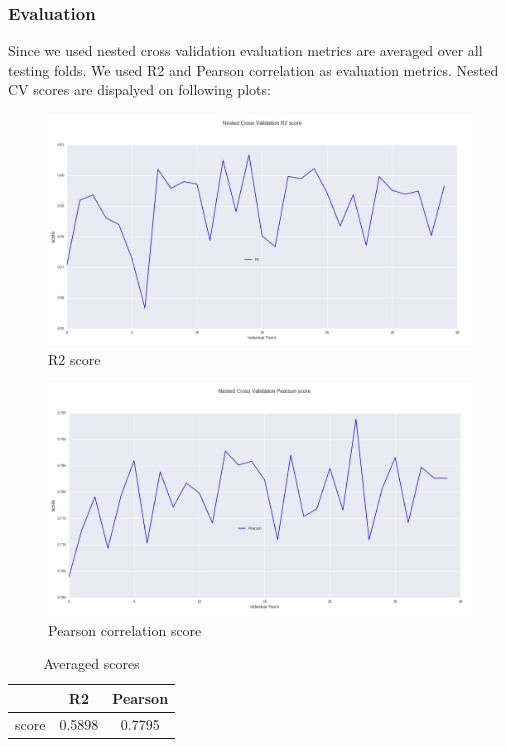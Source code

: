 \documentclass[10pt, a4paper]{article}
\begin{document}
\subsubsection{Evaluation}
Since we used nested cross validation evaluation metrics are averaged over all testing folds. We used R2 and Pearson correlation as evaluation metrics. Nested CV scores are dispalyed on following plots:


\begin{figure}
\begin{center}
	\centering
	\includegraphics[scale=0.36]{R2.png}
	\caption{R2 score}
\end{center}
\end{figure}


\begin{figure}
\begin{center}
	\centering
	\includegraphics[scale=0.36]{Pearson.png}
	\caption{Pearson correlation score}
\end{center}
\end{figure}

\begin{table}
\caption{Averaged scores}
\label{tab:narrow-table}
\begin{center}
\begin{tabular}{ccc}
\toprule
& R2 & Pearson\\
\midrule
score & 0.5898 & 0.7795 \\
\bottomrule
\end{tabular}
\end{center}
\end{table}
\end{document}
